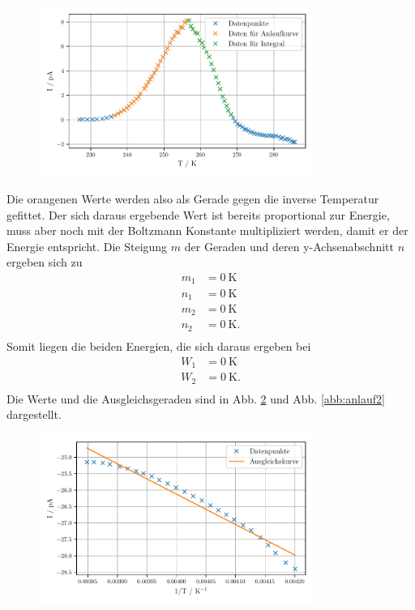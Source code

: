 \begin{figure}
    \centering
    \includegraphics[width=0.8\textwidth]{figures/data_wo_bkg2.pdf}
    \caption{}
    \label{abb:wo_bkg2}
\end{figure}

Die orangenen Werte werden also als Gerade gegen die inverse Temperatur gefittet. Der sich daraus ergebende Wert ist bereits proportional zur Energie, muss aber noch mit der Boltzmann Konstante multipliziert werden, damit er der Energie entspricht. Die Steigung $m$ der Geraden und deren y-Achsenabschnitt $n$ ergeben sich zu 
\begin{align*}
    m_{1} &= \SI{0}{\kelvin} \\
    n_{1} &= \SI{0}{\kelvin} \\
    m_{2} &= \SI{0}{\kelvin} \\
    n_{2} &= \SI{0}{\kelvin}. \\
\end{align*}
Somit liegen die beiden Energien, die sich daraus ergeben bei 
\begin{align*}
    W_{1} &= \SI{0}{\kelvin} \\
    W_{2} &= \SI{0}{\kelvin}. \\
\end{align*}
Die Werte und die Ausgleichsgeraden sind in Abb. \ref{abb:anlauf1} und Abb. \ref{abb:anlauf2} dargestellt. 

\begin{figure}
    \centering
    \includegraphics[width=0.8\textwidth]{figures/anlauf1.pdf}
    \caption{}
    \label{abb:anlauf1}
\end{figure}

